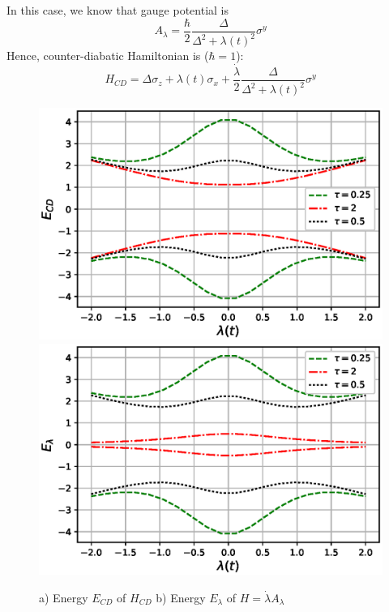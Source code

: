 \documentclass[11pt,a4paper]{article}
\begin{document}
In this case, we know that gauge potential is 
\begin{equation}
A_{\lambda}= \dfrac{\hbar}{2}\dfrac{\Delta }{\Delta^2 + \lambda(t)^2} \sigma^y
\end{equation}
Hence, counter-diabatic Hamiltonian is ($\hbar=1$):
\begin{equation}
H_{CD}= \Delta \sigma_z + \lambda(t) \sigma_x + \dfrac{\dot{\lambda} }{2}\dfrac{\Delta }{\Delta^2 + \lambda(t)^2} \sigma^y
\end{equation}

\begin{figure}[!ht]
\begin{center}
\includegraphics[scale=0.5]{pics/energy_cd_2level_sys.eps} 
\includegraphics[scale=0.5]{pics/energy_gauge_potn_2level.eps} 
\caption{a) Energy $E_{CD}$ of $H_{CD}$ b) Energy $E_{\lambda}$ of $H= \dot{\lambda}A_{\lambda}$ }
\end{center}
\end{figure}
\end{document}
